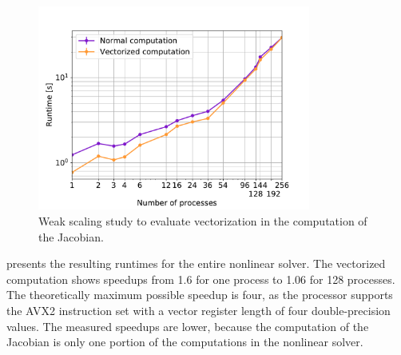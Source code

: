 \begin{figure}
  \centering%
  \includegraphics[width=0.8\textwidth]{images/results/studies/vectorized.pdf}%
  \caption{Weak scaling study to evaluate vectorization in the computation of the Jacobian.}%
  \label{fig:vectorized_jacobian}%
\end{figure}

 presents the resulting runtimes for the entire nonlinear solver. 
The vectorized computation shows speedups from \num{1.6} for one process to \num{1.06} for 128 processes. The theoretically maximum possible speedup is four, as the processor supports the AVX2 instruction set with a vector register length of four double-precision values. The measured speedups are lower, because the computation of the Jacobian is only one portion of the computations in the nonlinear solver. 

